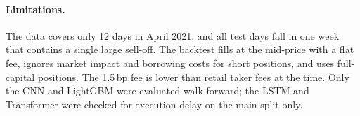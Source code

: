 \paragraph{Limitations.} The data covers only 12 days in April 2021, and all test days fall in
one week that contains a single large sell-off. The backtest fills at the mid-price with a
flat fee, ignores market impact and borrowing costs for short positions, and uses
full-capital positions. The 1.5\,bp fee is lower than retail taker fees at the time. Only
the CNN and LightGBM were evaluated walk-forward; the LSTM and Transformer were checked for
execution delay on the main split only.
